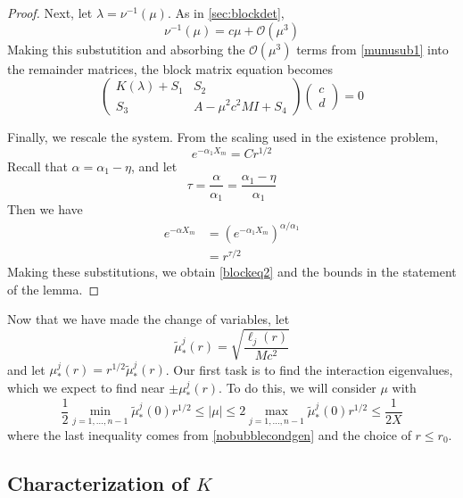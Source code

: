 \documentclass[thesis.tex]{subfiles}
\begin{document}
\begin{lemma}
\begin{proof}
Next, let $\lambda = \nu^{-1}(\mu)$. As in \cref{sec:blockdet},
\begin{equation}\label{munusub1}
\nu^{-1}(\mu) = c \mu + \mathcal{O}(\mu^3)
\end{equation}
Making this substutition and absorbing the $\mathcal{O}(\mu^3)$ terms from \cref{munusub1} into the remainder matrices, the block matrix equation becomes
\begin{equation}\label{blockeqred1}
\begin{pmatrix}
K(\lambda) + S_1 & S_2 \\
S_3 & A - \mu^2 c^2 M I + S_4
\end{pmatrix}
\begin{pmatrix} c \\ d \end{pmatrix} = 0
\end{equation}

Finally, we rescale the system. From the scaling used in the existence problem,
\[
e^{-\alpha_1 X_m} = C r^{1/2} 
\]
Recall that $\alpha = \alpha_1 - \eta$, and let 
\[
\tau = \frac{\alpha}{\alpha_1} = \frac{\alpha_1 - \eta}{\alpha_1}
\]
Then we have
\begin{align*}
e^{-\alpha X_m} &= \left( e^{-\alpha_1 X_m} \right)^{\alpha/\alpha_1} \\
&= r^{\tau / 2}
\end{align*}
Making these substitutions, we obtain \cref{blockeq2} and the bounds in the statement of the lemma.
\end{proof}
\end{lemma}

Now that we have made the change of variables, let
\[
\tilde{\mu}_*^j(r) = \sqrt{\frac{\ell_j(r)}{M c^2}}
\]
and let $\mu_*^j(r) = r^{1/2} \tilde{\mu}_*^j(r)$. Our first task is to find the interaction eigenvalues, which we expect to find near $\pm \mu_*^j(r)$. To do this, we will consider $\mu$ with
\begin{equation}\label{mucondition}
\frac{1}{2} \min_{j = 1, \dots, n-1}\tilde{\mu}_*^j(0) r^{1/2} \leq |\mu| \leq 2 \max_{j = 1, \dots, n-1}\tilde{\mu}_*^j(0) r^{1/2} \leq \frac{1}{2X}
\end{equation}
where the last inequality comes from \cref{nobubblecondgen} and the choice of $r \leq r_0$.

\subsection{Characterization of $K$}
\end{document}
